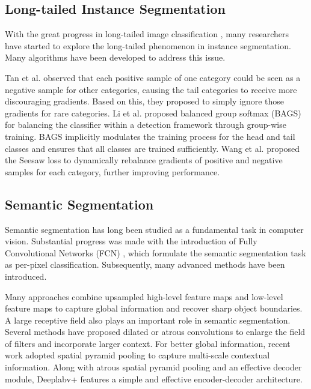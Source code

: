 \documentclass[final]{cvpr}
\begin{document}
\subsection{Long-tailed Instance Segmentation}
With the great progress in long-tailed image classification \cite{buda2018systematic,huang2016learning,DBLP:conf/cvpr/CuiJLSB19, he2009learning,chawla2002smote,DBLP:conf/nips/RenYSMZYL20,DBLP:conf/iclr/KangXRYGFK20, DBLP:journals/corr/abs-2010-01809, DBLP:journals/corr/abs-2101-10633, DBLP:conf/nips/TangHZ20, Zhong_2021_CVPR,cui2021parametric}, many researchers have started to explore the long-tailed phenomenon in instance segmentation. Many algorithms \cite{tan2020eql, li2020overcoming, wang2021seesaw} have been developed to address this issue.


Tan et al. \cite{tan2020eql} observed that each positive sample of one category could be seen as a negative sample for other categories, causing the tail categories to receive more discouraging gradients. Based on this, they proposed to simply ignore those gradients for rare categories. 
Li et al. \cite{li2020overcoming} proposed balanced group softmax (BAGS) for balancing the classifier within a detection framework through group-wise training. BAGS implicitly modulates the training process for the head and tail classes and ensures that all classes are trained sufficiently. Wang et al. \cite{wang2021seesaw} proposed the Seesaw loss to dynamically rebalance gradients of positive and negative samples for each category, further improving performance.


\subsection{Semantic Segmentation}
Semantic segmentation has long been studied as a fundamental task in computer vision. Substantial progress was made with the introduction of Fully Convolutional Networks (FCN) \cite{long2015fully}, which formulate the semantic segmentation task as per-pixel classification. Subsequently, many advanced methods have been introduced.


Many approaches \cite{amirul2017gated,badrinarayanan2017segnet,lin2017refinenet, pohlen2017full, ronneberger2015u} combine upsampled high-level feature maps and low-level feature maps to capture global information and recover sharp object boundaries. A large receptive field also plays an important role in semantic segmentation. Several methods \cite{chen2017deeplab,chen2014semantic,yu2015multi} have proposed dilated or atrous convolutions to enlarge the field of filters and incorporate larger context. For better global information, recent work \cite{chen2017rethinking, chen2018encoder, DBLP:conf/cvpr/ZhaoSQWJ17} adopted spatial pyramid pooling to capture multi-scale contextual information. Along with atrous spatial pyramid pooling and an effective decoder module, Deeplabv+ \cite{chen2018encoder} features a simple and effective encoder-decoder architecture.
\end{document}
